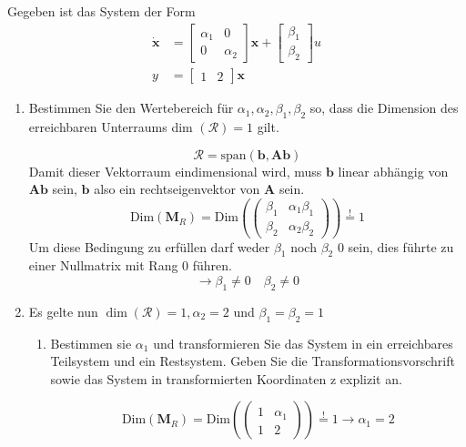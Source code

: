 \documentclass{article}
\begin{document}
\begin{task}
Gegeben ist das System der Form
\[ 
\begin{aligned} \dot{\mathbf{x}} &=\left[\begin{array}{cc}{\alpha_{1}} & {0} \\ {0} & {\alpha_{2}}\end{array}\right] \mathbf{x}+\left[\begin{array}{c}{\beta_{1}} \\ {\beta_{2}}\end{array}\right] u \\ y &=\left[\begin{array}{ll}{1} & {2}\end{array}\right] \mathbf{x} \end{aligned}
 \]
 \begin{enumerate}[i]
     \item Bestimmen Sie den Wertebereich für $\alpha_{1}, \alpha_{2}, \beta_{1}, \beta_{2}$ so, dass die Dimension des erreichbaren Unterraums dim $(\mathcal{R})=1$ gilt.
     \begin{solution}
     \[ \mathcal{R} = \text{span}\left(\mathbf{b},\mathbf{Ab}\right)\]
     Damit dieser Vektorraum eindimensional wird, muss $\mathbf{b}$ linear abhängig von $\mathbf{Ab}$ sein, $\mathbf{b}$ also ein rechtseigenvektor von $\mathbf{A}$ sein.
     \[\text{Dim}\left(\mathbf{M}_R\right)=
     \text{Dim}\left(
     \begin{pmatrix}
     \beta_1 & \alpha_1 \beta_1 \\
     \beta_2 & \alpha_2 \beta_2
     \end{pmatrix}
     \right)
     \stackrel{!}{=} 1
     \]
     Um diese Bedingung zu erfüllen darf weder $\beta_1$ noch $\beta_2$ 0 sein, dies führte zu einer Nullmatrix mit Rang 0 führen.
     \[\rightarrow \beta_1 \neq 0 \quad \beta_2 \neq 0\]
     \end{solution}
     \item Es gelte nun $\operatorname{dim}(\mathcal{R})=1, \alpha_{2}=2$ und $\beta_{1}=\beta_{2}=1$
     \begin{enumerate}[A]
         \item Bestimmen sie $\alpha_{1}$ und transformieren Sie das System in ein erreichbares Teilsystem und ein Restsystem. Geben Sie die Transformationsvorschrift sowie
das System in transformierten Koordinaten z explizit an.
\begin{solution}
\[\text{Dim}\left(\mathbf{M}_R\right)=
     \text{Dim}\left(
     \begin{pmatrix}
     1 & \alpha_1 \\
     1 & 2
     \end{pmatrix}
     \right)
     \stackrel{!}{=} 1 \rightarrow \alpha_1 = 2
     \]
     

\end{solution}
\end{enumerate}
\end{enumerate}
\end{task}
\end{document}
